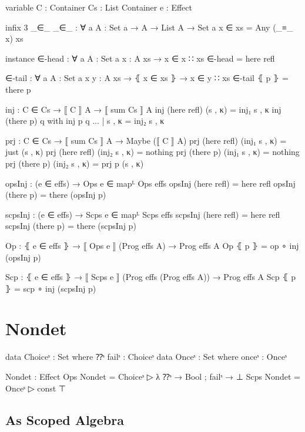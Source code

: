 \begin{code}
variable
  C  : Container
  Cs : List Container
  e : Effect

infix 3 _∈_
_∈_ : ∀ {a} {A : Set a} → A → List A → Set a
x ∈ xs = Any (_≡_ x) xs

instance
  ∈-head : ∀ {a} {A : Set a} {x : A} {xs} → x ∈ x ∷ xs
  ∈-head = here refl

  ∈-tail : ∀ {a} {A : Set a} {x y : A} {xs} → ⦃ x ∈ xs ⦄ → x ∈ y ∷ xs
  ∈-tail ⦃ p ⦄ = there p

inj : C ∈ Cs → ⟦ C ⟧ A → ⟦ sum Cs ⟧ A
inj (here refl) (s , κ) = inj₁ s , κ
inj (there p)   q       with inj p q
... | s , κ = inj₂ s , κ

prj : C ∈ Cs → ⟦ sum Cs ⟧ A → Maybe (⟦ C ⟧ A)
prj (here refl) (inj₁ s , κ) = just (s , κ)
prj (here refl) (inj₂ s , κ) = nothing
prj (there p)   (inj₁ s , κ) = nothing
prj (there p)   (inj₂ s , κ) = prj p (s , κ)

opsInj : (e ∈ effs) → Ops e ∈ mapᴸ Ops effs
opsInj (here refl) = here refl
opsInj (there p)   = there (opsInj p)

scpsInj : (e ∈ effs) → Scps e ∈ mapᴸ Scps effs
scpsInj (here refl) = here refl
scpsInj (there p)   = there (scpsInj p)

Op : ⦃ e ∈ effs ⦄ → ⟦ Ops e ⟧ (Prog effs A) → Prog effs A
Op ⦃ p ⦄ = op ∘ inj (opsInj p)

Scp : ⦃ e ∈ effs ⦄ → ⟦ Scps e ⟧ (Prog effs (Prog effs A)) → Prog effs A
Scp ⦃ p ⦄ = scp ∘ inj (scpsInj p)
\end{code}


\section{Nondet}

\begin{code}
data Choiceˢ  : Set where ⁇ˢ failˢ  : Choiceˢ
data Onceˢ    : Set where onceˢ     : Onceˢ

Nondet : Effect
Ops   Nondet = Choiceˢ  ▷ λ{ ⁇ˢ → Bool ; failˢ → ⊥ }
Scps  Nondet = Onceˢ    ▷ const ⊤
\end{code}

\subsection{As Scoped Algebra}

